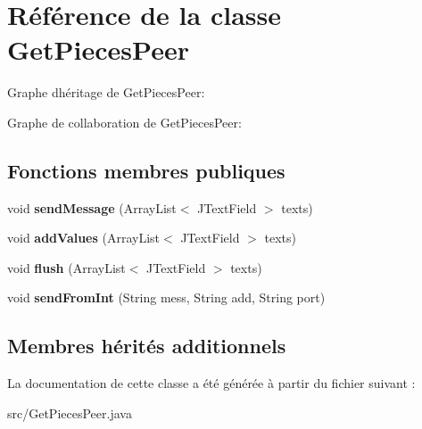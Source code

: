 \hypertarget{classGetPiecesPeer}{}\section{Référence de la classe Get\+Pieces\+Peer}
\label{classGetPiecesPeer}


Graphe d\textquotesingle{}héritage de Get\+Pieces\+Peer\+:


Graphe de collaboration de Get\+Pieces\+Peer\+:
\subsection*{Fonctions membres publiques}
\begin{DoxyCompactItemize}
\item 
\mbox{\label{classGetPiecesPeer_abae9441b8f9a09b5e2b7731e523c6f35}} 
void {\bfseries send\+Message} (Array\+List$<$ J\+Text\+Field $>$ texts)
\item 
\mbox{\label{classGetPiecesPeer_aabd0a93f71b8b19a044ebd84f5f81a1d}} 
void {\bfseries add\+Values} (Array\+List$<$ J\+Text\+Field $>$ texts)
\item 
\mbox{\label{classGetPiecesPeer_a2ba7001f2683daeff10f64e370c0b6c0}} 
void {\bfseries flush} (Array\+List$<$ J\+Text\+Field $>$ texts)
\item 
\mbox{\label{classGetPiecesPeer_aea81e871851f616cd81e920cd692c408}} 
void {\bfseries send\+From\+Int} (String mess, String add, String port)
\end{DoxyCompactItemize}
\subsection*{Membres hérités additionnels}


La documentation de cette classe a été générée à partir du fichier suivant \+:\begin{DoxyCompactItemize}
\item 
src/Get\+Pieces\+Peer.\+java\end{DoxyCompactItemize}
